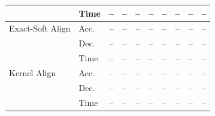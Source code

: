 \documentclass{article} %
\begin{document}
\begin{table}[t]
{{\begin{tabular}{@{}ll*{8}{c}@{}}
& Time  & -- & -- & -- & -- & -- & -- & -- & --  \\
\midrule
Exact-Soft Align
& Acc.  & -- & -- & -- & -- & -- & -- & -- & --  \\
& Dec.  & -- & -- & -- & -- & -- & -- & -- & --  \\
& Time  & -- & -- & -- & -- & -- & -- & -- & --  \\
\midrule
Kernel Align
& Acc.  & -- & -- & -- & -- & -- & -- & -- & -- \\
& Dec.  & -- & -- & -- & -- & -- & -- & -- & -- \\
& Time  & -- & -- & -- & -- & -- & -- & -- & -- \\
\bottomrule
\end{tabular}%
}%
}
\end{table}
\end{document}
